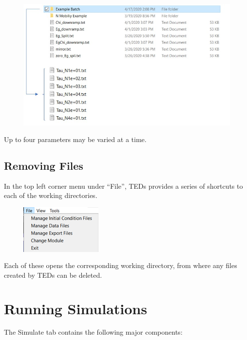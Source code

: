 \documentclass[11pt,letterpaper,titlepage]{article}
\begin{document}
		\begin{figure}[H]
			\label{fig:batch_example_dir}
			\centering
			\includegraphics[scale=0.9]{"batch_example_dir"}
		\end{figure}
	
		\par Up to four parameters may be varied at a time.
		
		\subsection{Removing Files}
		
		\par In the top left corner menu under “File”, TEDs provides a series of shortcuts to each of the working directories.
		
		\begin{figure}[H]
			\label{fig:file_menu}
			\centering
			\includegraphics[scale=1]{"file_menu"}
		\end{figure}
	
		\par Each of these opens the corresponding working directory, from where any files created by TEDs can be deleted.
		
	\newpage
	\section{Running Simulations}
	
	\par The Simulate tab contains the following major components:
	
\end{document}
